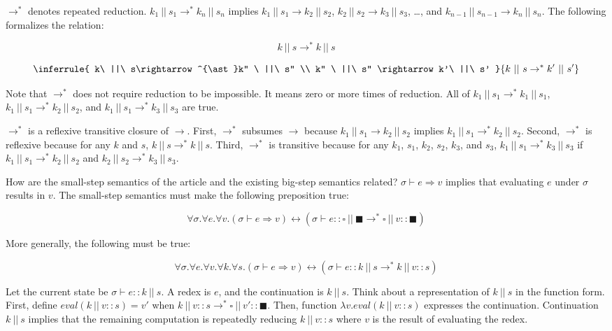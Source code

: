 $\rightarrow^\ast$ denotes repeated reduction. $k_1\ ||\ s_1\rightarrow^\ast k_n\
||\ s_n$ implies $k_1\ ||\ s_1\rightarrow k_2\ ||\ s_2$, $k_2\ ||\ s_2\rightarrow
k_3\ ||\ s_3$, …, and $k_{n-1}\ ||\ s_{n-1}\rightarrow k_n\ ||\ s_n$. The
following formalizes the relation:

\[k\ ||\ s\rightarrow^{\ast}k\ ||\ s\]

\[
\inferrule
{ k\ ||\ s\rightarrow^{\ast}k'' \ ||\ s'' \\
  k'' \ ||\ s'' \rightarrow k'\ ||\ s' }
{ k\ ||\ s\rightarrow^{\ast}k'\ ||\ s' }
\]

Note that $\rightarrow^\ast$ does not require reduction to be impossible. It
means zero or more times of reduction. All of $k_1\ ||\ s_1\rightarrow^\ast k_1\
||\ s_1$, $k_1\ ||\ s_1\rightarrow^\ast k_2\ ||\ s_2$, and $k_1\ ||\
s_1\rightarrow^\ast k_3\ ||\ s_3$ are true.

$\rightarrow^\ast$ is a reflexive transitive closure of $\rightarrow$. First,
$\rightarrow^\ast$ subsumes $\rightarrow$ because $k_1\ ||\ s_1\rightarrow k_2\
||\ s_2$ implies $k_1\ ||\ s_1\rightarrow^\ast k_2\ ||\ s_2$. Second,
$\rightarrow^\ast$ is reflexive because for any $k$ and $s$, $k\ ||\
s\rightarrow^\ast k\ ||\ s$. Third, $\rightarrow^\ast$ is transitive because for
any $k_1$, $s_1$, $k_2$, $s_2$, $k_3$, and $s_3$, $k_1\ ||\ s_1\rightarrow^\ast
k_3\ ||\ s_3$ if $k_1\ ||\ s_1\rightarrow^\ast k_2\ ||\ s_2$ and $k_2\ ||\
s_2\rightarrow^\ast k_3\ ||\ s_3$.

How are the small-step semantics of the article and the existing big-step
semantics related? $\sigma\vdash e\Rightarrow v$ implies that evaluating $e$
under $\sigma$ results in $v$. The small-step semantics must make the following
preposition true:

\[\forall \sigma.\forall e.\forall v.(\sigma\vdash e\Rightarrow
v)\leftrightarrow(\sigma\vdash e:: \square\ ||\
\blacksquare\rightarrow^\ast\square\ ||\ v::\blacksquare)\]

More generally, the following must be true:

\[\forall \sigma.\forall e.\forall v.\forall k.\forall s.(\sigma\vdash
e\Rightarrow                v)\leftrightarrow(\sigma\vdash e::k\ ||\
s\rightarrow^\ast k\ ||\ v::s)\]

Let the current state be $\sigma\vdash e::k\ ||\ s$. A redex is $e$, and the
continuation is $k\ ||\ s$. Think about a representation of $k\ ||\ s$ in the
function form. First, define $\mathit{eval}(k\ ||\ v::s)=v'$ when $k\ ||\
v::s\rightarrow^\ast\square\ ||\ v'::\blacksquare$. Then, function $\lambda
v.\mathit{eval}(k\ ||\ v::s)$ expresses the continuation. Continuation $k\ ||\ s$
implies that the remaining computation is repeatedly reducing $k\ ||\ v::s$ where
$v$ is the result of evaluating the redex.

